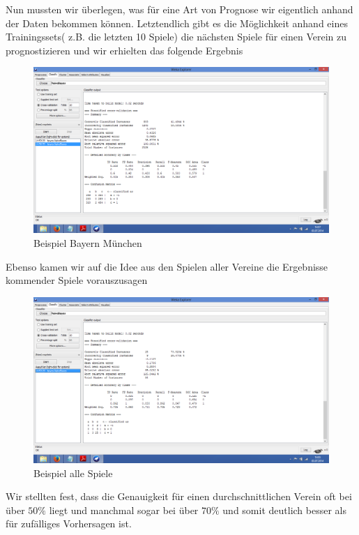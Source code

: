 \documentclass[
10pt,
a4paper
]{scrartcl}
\begin{document}
Nun mussten wir überlegen, was für eine Art von Prognose wir eigentlich anhand der Daten bekommen können.
Letztendlich gibt es die Möglichkeit anhand eines Trainingssets( z.B. die letzten 10 Spiele) die nächsten Spiele für einen Verein zu prognostizieren
und wir erhielten das folgende Ergebnis

\begin{figure}[ht2]
\centering
  \includegraphics[scale=0.3]{Weka2.png}
\caption{Beispiel Bayern München}
\label{fig7}
\end{figure}

Ebenso kamen wir auf die Idee aus den Spielen aller Vereine die Ergebnisse kommender Spiele vorauszusagen

\begin{figure}[ht3]
\centering
  \includegraphics[scale=0.3]{Weka1.png}
\caption{Beispiel alle Spiele}
\label{fig8}
\end{figure}

Wir stellten fest, dass die Genauigkeit für einen durchschnittlichen Verein oft bei über $50\%$ liegt und manchmal sogar bei über $70\%$
und somit deutlich besser als für zufälliges Vorhersagen ist.
\end{document}
